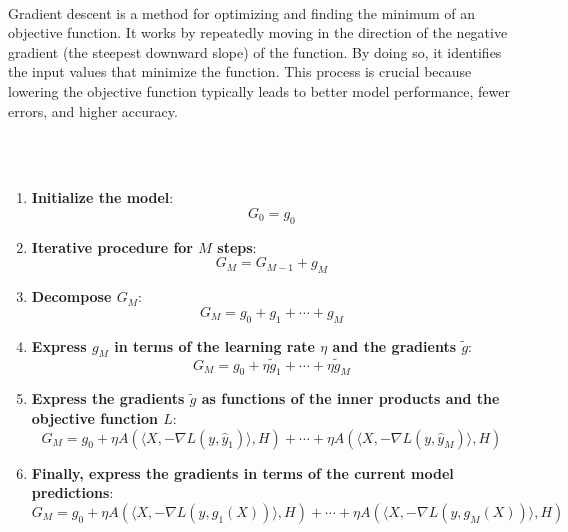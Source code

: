 \documentclass[12pt]{article}
\begin{document}
\begin{enumerate}
 \\ 
Gradient descent is a method for optimizing and finding the minimum of an objective function. It works by repeatedly moving in the direction of the negative gradient (the steepest downward slope) of the function. By doing so, it identifies the input values that minimize the function. This process is crucial because lowering the objective function typically leads to better model performance, fewer errors, and higher accuracy. 

\newpage
{} \\ \\ 
\begin{enumerate}
    \item \textbf{Initialize the model}:
    \[
    G_0 = g_0
    \]

    \item \textbf{Iterative procedure for \( M \) steps}:
    \[
    G_M = G_{M-1} + g_M
    \]

    \item \textbf{Decompose \( G_M \)}:
    \[
    G_M = g_0 + g_1 + \cdots + g_M
    \]

    \item \textbf{Express \( g_M \) in terms of the learning rate \( \eta \) and the gradients \( \tilde{g} \)}:
    \[
    G_M = g_0 + \eta \tilde{g}_1 + \cdots + \eta \tilde{g}_M
    \]

    \item \textbf{Express the gradients \( \tilde{g} \) as functions of the inner products and the objective function \( L \)}:
    \[
    G_M = g_0 + \eta A (\langle X, -\nabla L(y, \hat{y}_1) \rangle, H) + \cdots + \eta A (\langle X, -\nabla L(y, \hat{y}_M) \rangle, H)
    \]

    \item \textbf{Finally, express the gradients in terms of the current model predictions}:
    \[
    G_M = g_0 + \eta A (\langle X, -\nabla L(y, g_1(X)) \rangle, H) + \cdots + \eta A (\langle X, -\nabla L(y, g_M(X)) \rangle, H)
    \]
\end{enumerate}


\end{enumerate}
\end{document}
